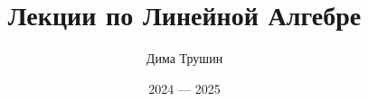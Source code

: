 \documentclass{article}
\begin{document}
\title{Лекции по Линейной Алгебре}
\author{Дима Трушин}
\date{2024 --- 2025}
	
\maketitle
\tableofcontents

















\end{document}
